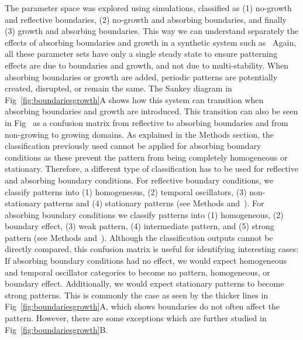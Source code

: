 \documentclass[10pt,letterpaper]{article}
\begin{document}
The parameter space was explored using simulations, classified as  (1) no-growth and reflective boundaries, (2) no-growth and absorbing boundaries, and finally (3) growth and absorbing boundaries. This way we can understand separately the effects of absorbing boundaries and growth in a synthetic system such as~\cite{Oliver2023}
Again, all these parameter sets have only a single steady state to ensure patterning effects are due to boundaries and growth, and not due to multi-stability.
When absorbing boundaries or growth are added, periodic patterns are potentially created, disrupted, or remain the same.
The Sankey diagram in Fig~\ref{fig:boundariesgrowth}A shows how this system can transition when absorbing boundaries and growth are introduced.
This transition can also be seen in Fig~ as a confusion matrix from reflective to absorbing boundaries and from non-growing to growing domains.
As explained in the Methods section, the classification previously used cannot be applied for absorbing boundary conditions as these prevent the pattern from being completely homogeneous or stationary.  %
Therefore, a different type of classification has to be used for reflective and absorbing boundary conditions.
For reflective boundary conditions, we classify patterns into (1) homogeneous, (2) temporal oscillators, (3) non-stationary patterns and (4) stationary patterns (see Methods and~). For absorbing boundary conditions we classify patterns into (1) homogeneous, (2) boundary effect, (3) weak pattern, (4) intermediate pattern, and (5) strong pattern (see Methods and~).
Although the classification outputs cannot be directly compared, this confusion matrix is useful for identifying interesting cases:
If absorbing boundary conditions had no effect, we would expect homogeneous and temporal oscillator categories to become no pattern, homogeneous, or boundary effect.
Additionally, we would expect stationary patterns to become strong patterns.
This is commonly the case as seen by the thicker lines in Fig~\ref{fig:boundariesgrowth}A, which shows boundaries do not often affect the pattern.
However, there are some exceptions which are further studied in Fig~\ref{fig:boundariesgrowth}B.
\end{document}
